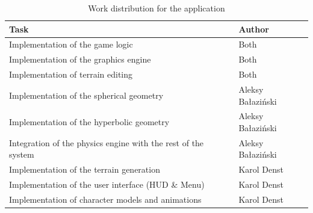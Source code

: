 \begin{table}[h]
    \centering
    \begin{tabular}{|l|l|}
        \hline
        Task                                                          & Author            \\ \hline
        Implementation of the game logic                              & Both              \\
        Implementation of the graphics engine                         & Both              \\
        Implementation of terrain editing                             & Both              \\
        Implementation of the spherical geometry                      & Aleksy Bałaziński \\
        Implementation of the hyperbolic geometry                     & Aleksy Bałaziński \\
        Integration of the physics engine with the rest of the system & Aleksy Bałaziński \\
        Implementation of the terrain generation                      & Karol Denst       \\
        Implementation of the user interface (HUD \& Menu)            & Karol Denst       \\
        Implementation of character models and animations             & Karol Denst       \\
        \hline
    \end{tabular}
    \caption{Work distribution for the application}
    \label{tab:division_of_work_on_the_application}
\end{table}

